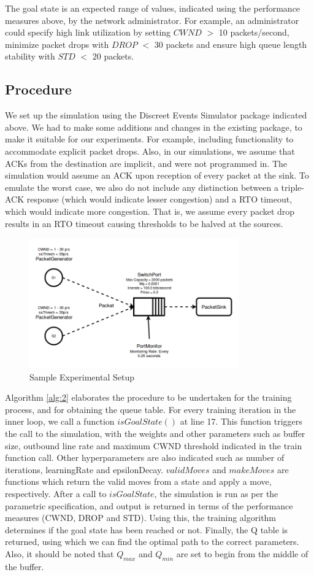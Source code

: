 \documentclass[conference, 10pt]{IEEEtran}
\begin{document}
The goal state is an expected range of values, indicated using the performance measures above, by the network administrator. For example, an administrator could specify high link utilization by setting $CWND$ $>$ 10 packets/second, minimize packet drops with $DROP$ $<$ 30 packets and ensure high queue length stability with $STD$ $<$ 20 packets.

\subsection{Procedure}
\label{sec:prop:procedure}

We set up the simulation using the Discreet Events Simulator package indicated above. We had to make some additions and changes in the existing package, to make it suitable for our experiments. For example, including functionality to accommodate explicit packet drops. Also, in our simulations, we assume that ACKs from the destination are implicit, and were not programmed in. The simulation would assume an ACK upon reception of every packet at the sink. To emulate the worst case, we also do not include any distinction between a triple-ACK response (which would indicate lesser congestion) and a RTO timeout, which would indicate more congestion. That is, we assume every packet drop results in an RTO timeout causing thresholds to be halved at the sources. 
\begin{figure}[ht!]
	\centering
	\includegraphics[width = 90mm]{Experiment.png}
	\caption{Sample Experimental Setup}
	\label{fig:exper1}
\end{figure}

Algorithm \ref{alg:2} elaborates the procedure to be undertaken for the training process, and for obtaining the queue table. For every training iteration in the inner loop, we call a function $isGoalState()$ at line 17. This function triggers the call to the simulation, with the weights and other parameters such as buffer size, outbound line rate and maximum CWND threshold indicated in the train function call. Other hyperparameters are also indicated such as number of iterations, learningRate and epsilonDecay. $validMoves$ and $makeMoves$ are functions which return the valid moves from a state and apply a move, respectively. After a call to $isGoalState$, the simulation is run as per the parametric specification, and output is returned in terms of the performance measures (CWND, DROP and STD). Using this, the training algorithm determines if the goal state has been reached or not. Finally, the Q table is returned, using which we can find the optimal path to the correct parameters. Also, it should be noted that $Q_{max}$ and $Q_{min}$ are set to begin from the middle of the buffer. 
\end{document}
